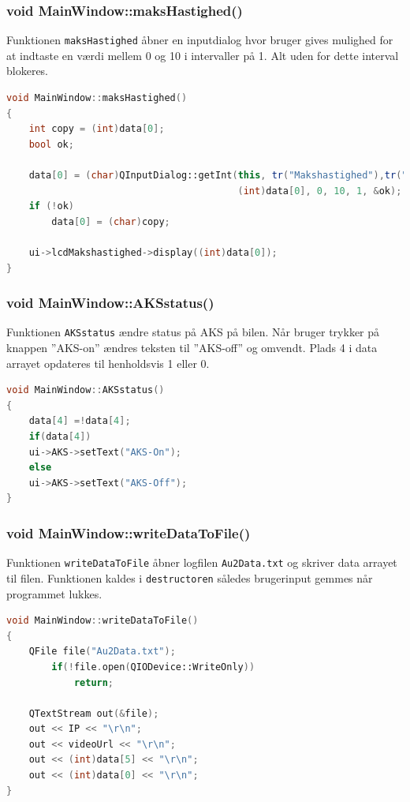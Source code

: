 \subsubsection{void MainWindow::maksHastighed()}
Funktionen \texttt{maksHastighed} åbner en inputdialog hvor bruger gives mulighed for at indtaste en værdi mellem 0 og 10 i intervaller på 1. Alt uden for dette interval blokeres.  
\begin{lstlisting}[caption={maksHastighed},label=lst:maksHastighed, language=c++]
void MainWindow::maksHastighed()
{
    int copy = (int)data[0];
    bool ok;

    data[0] = (char)QInputDialog::getInt(this, tr("Makshastighed"),tr("Indtast makshastigheden"),
                                         (int)data[0], 0, 10, 1, &ok);
    if (!ok)
        data[0] = (char)copy;

    ui->lcdMakshastighed->display((int)data[0]);
}
\end{lstlisting}

\clearpage

\subsubsection{void MainWindow::AKSstatus()}
Funktionen \texttt{AKSstatus} ændre status på AKS på bilen. Når bruger trykker på knappen ''AKS-on'' ændres teksten til ''AKS-off'' og omvendt. Plads 4 i data arrayet opdateres til henholdsvis 1 eller 0. 
\begin{lstlisting}[caption={AKSstatus},label=lst:AKSstatus, language=c++]
void MainWindow::AKSstatus()
{
    data[4] =!data[4];
    if(data[4])
    ui->AKS->setText("AKS-On");
    else
    ui->AKS->setText("AKS-Off");
}
\end{lstlisting}

\subsubsection{void MainWindow::writeDataToFile()}
Funktionen \texttt{writeDataToFile} åbner logfilen \texttt{Au2Data.txt} og skriver data arrayet til filen. Funktionen kaldes i \texttt{destructoren} således brugerinput gemmes når programmet lukkes. 
\begin{lstlisting}[caption={writeDataToFile},label=lst:writeDataToFile, language=c++]
void MainWindow::writeDataToFile()
{
    QFile file("Au2Data.txt");
        if(!file.open(QIODevice::WriteOnly))
            return;

    QTextStream out(&file);
    out << IP << "\r\n";
    out << videoUrl << "\r\n";
    out << (int)data[5] << "\r\n";
    out << (int)data[0] << "\r\n";
}
\end{lstlisting}

